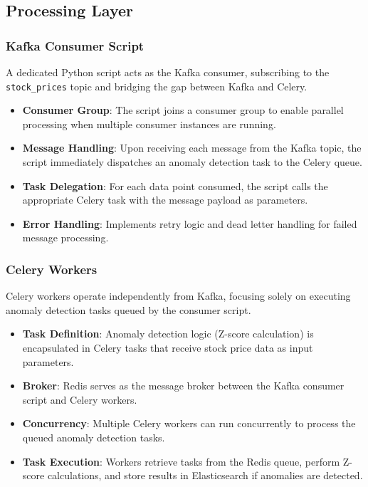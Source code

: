 \subsection{Processing Layer}

\subsubsection{Kafka Consumer Script}

A dedicated Python script acts as the Kafka consumer, subscribing to the \texttt{stock\_prices} topic and bridging the gap between Kafka and Celery.
\begin{itemize}
    \item \textbf{Consumer Group}: The script joins a consumer group to enable parallel processing when multiple consumer instances are running.
    \item \textbf{Message Handling}: Upon receiving each message from the Kafka topic, the script immediately dispatches an anomaly detection task to the Celery queue.
    \item \textbf{Task Delegation}: For each data point consumed, the script calls the appropriate Celery task with the message payload as parameters.
    \item \textbf{Error Handling}: Implements retry logic and dead letter handling for failed message processing.
\end{itemize}

\subsubsection{Celery Workers}

Celery workers operate independently from Kafka, focusing solely on executing anomaly detection tasks queued by the consumer script.
\begin{itemize}
    \item \textbf{Task Definition}: Anomaly detection logic (Z-score calculation) is encapsulated in Celery tasks that receive stock price data as input parameters.
    \item \textbf{Broker}: Redis serves as the message broker between the Kafka consumer script and Celery workers.
    \item \textbf{Concurrency}: Multiple Celery workers can run concurrently to process the queued anomaly detection tasks.
    \item \textbf{Task Execution}: Workers retrieve tasks from the Redis queue, perform Z-score calculations, and store results in Elasticsearch if anomalies are detected.
\end{itemize}

